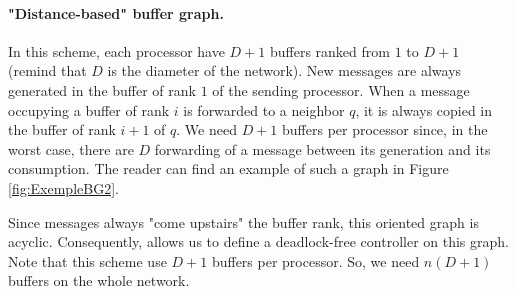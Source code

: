 \documentclass[11pt]{article}
\begin{document}
\paragraph{"Distance-based" buffer graph.} In this scheme, each processor have $D+1$ buffers ranked from $1$ to $D+1$ (remind that $D$ is the diameter of the network). New messages are always generated in the buffer of rank $1$ of the sending processor. When a message occupying a buffer of rank $i$ is forwarded to a neighbor $q$, it is always copied in the buffer of rank $i+1$ of $q$. We need $D+1$ buffers per processor since, in the worst case, there are $D$ forwarding of a message between its generation and its consumption. The reader can find an example of such a graph in Figure \ref{fig:ExempleBG2}.

Since messages always "come upstairs" the buffer rank, this oriented graph is acyclic. Consequently, \cite{MS78} allows us to define a deadlock-free controller on this graph. Note that this scheme use $D+1$ buffers per processor. So, we need $n(D+1)$ buffers on the whole network.
\end{document}

